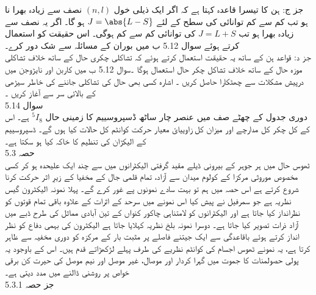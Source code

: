       جز ج: ہن کا تیسرا قاعدہ کہتا ہے کہ اگر ایک ذیلی خول 
   \((n,l)\)
       نصف سے زیادہ بھرا نا ہو تب کم سے کم توانائی کی سطح کے لئے 
    \(J=\abs{L-S}\)
        ہو گا۔ اگر یہ نصف سے زیادہ بھرا ہو تب
\( J=L+S\)
 کی توانائی کم سے کم ہوگی۔ اس حقیقت کو استعمال کرتے ہوئے سوال 5.12 ب میں بوران کے مسائلہ سے شک دور کرے۔\\ 
جز د: قواعد ہن کے ساتھ یہ حقیقت استعمال کرتے ہوئے کہ تشاکلی چکری حال کے ساتھ خلاف تشاکلی موزہ حال کے ساتھ خلاف تشاکل چکر حال استعمال ہوگا ۔سوال 5.12 ب میں کاربن اور نایڑوجن میں درپیش مشکلات سے چھٹکارا حاصل کریں ۔ اشارہ کسی بھی حال کی تشاکلی جاننے کی خاطر سیڑھی کے بالائی سر سے آغاز کریں ۔\\
 سوال 5.14\\
  دوری جدول کے چھٹے صف میں عنصر چار ساٹھ ڈسپروسییم کا زمینی حال
  \(^{5}I_{8}\) 
  ہے۔ اس کے کل چکر کل مدارچے اور میزان کل زاوییائ معیار حرکت کوانٹم کل حالات کیا ہوں گے۔ ڈسپروسییم کے الیکڑان  کی تنظیم کا خاکہ کیا ہو سکتا ہے۔\\
حصہ
 5.3\\
 
ٹھوس حال میں ہر جوہر کے بیرونی ڈیلے مقید گرفتی الیکٹرانوں میں سے چند ایک علیحدہ ہو کر کسی مخصوص موروثی مرکزا کے کولوم میدان سے آزاد، تمام قلمی جال کے مخفیا کے زیرِ اثر حرکت کرنا شروع کرتے ہے اس حصہ میں ہم تو بہت سادے نمونوں پے غور کرے گے۔ پہلا نمونہ الیکٹرون گیس نظریہ ہے جو سمرفيل نے پیش کیا اس نمونے میں سرحد کے اثرات کے علاوہ باقی تمام قوتوں کو نظرانداز کیا جاتا ہے اور الیکٹرانوں کو لامتناہی چاکور کنواں کے تین آبادی مماثل کی طرح ڈبے میں آزاد ذرات تصویر کیا جاتا ہے۔ دوسرا نمونہ بلخ نظریہ کہلایا جاتا ہے الیکٹرون کی بہمی دفاع کو نظر انداز کرتے ہوئے باقاعدگی سے ایک جیتنے فاصلے پر مثبت بار کے مرکزہ کو دوری مخفیہ سے ظاہر کرتا ہے، یہ نمونے ٹھوس اجسام کی کوانٹم نظریے کی طرف پہلے لڑکھڑاتے قدم ہیں۔ اس کے باوجود یہ پولی حصولمنات کا جموت میں گہرا کردار اور موصال، غیر موصل اور نیم موصل کی حیرت کن برقی خواص پر روشنی ڈالنے میں مدد دیتی ہے۔\\
جز حصہ
 5.3.1\\
 

